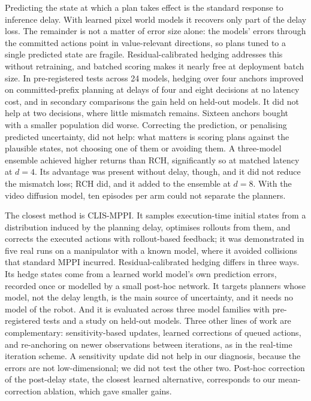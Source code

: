 \documentclass[pdflatex,sn-nature]{sn-jnl}%
\begin{document}
Predicting the state at which a plan takes effect is the standard response to inference delay\cite{findeisen2004computational,elasri2025rthcp,muppidi2026time}. With learned pixel world models it recovers only part of the delay loss. The remainder is not a matter of error size alone: the models' errors through the committed actions point in value-relevant directions, so plans tuned to a single predicted state are fragile. Residual-calibrated hedging addresses this without retraining, and batched scoring makes it nearly free at deployment batch size. In pre-registered tests across 24 models, hedging over four anchors improved on committed-prefix planning at delays of four and eight decisions at no latency cost, and in secondary comparisons the gain held on held-out models. It did not help at two decisions, where little mismatch remains. Sixteen anchors bought with a smaller population did worse. Correcting the prediction, or penalising predicted uncertainty, did not help: what matters is scoring plans against the plausible states, not choosing one of them or avoiding them. A three-model ensemble achieved higher returns than RCH, significantly so at matched latency at $d=4$. Its advantage was present without delay, though, and it did not reduce the mismatch loss; RCH did, and it added to the ensemble at $d=8$. With the video diffusion model, ten episodes per arm could not separate the planners.

The closest method is CLIS-MPPI\cite{liu2026clis}. It samples execution-time initial states from a distribution induced by the planning delay, optimises rollouts from them, and corrects the executed actions with rollout-based feedback; it was demonstrated in five real runs on a manipulator with a known model, where it avoided collisions that standard MPPI incurred. Residual-calibrated hedging differs in three ways. Its hedge states come from a learned world model's own prediction errors, recorded once or modelled by a small post-hoc network. It targets planners whose model, not the delay length, is the main source of uncertainty, and it needs no model of the robot. And it is evaluated across three model families with pre-registered tests and a study on held-out models. Three other lines of work are complementary: sensitivity-based updates\cite{zavala2009asnmpc,belvedere2026feedback}, learned corrections of queued actions\cite{lin2025speculative}, and re-anchoring on newer observations between iterations, as in the real-time iteration scheme\cite{diehl2005rti,melon2021receding}. A sensitivity update did not help in our diagnosis, because the errors are not low-dimensional; we did not test the other two. Post-hoc correction of the post-delay state\cite{jiang2026futurertc}, the closest learned alternative, corresponds to our mean-correction ablation, which gave smaller gains.
\end{document}

